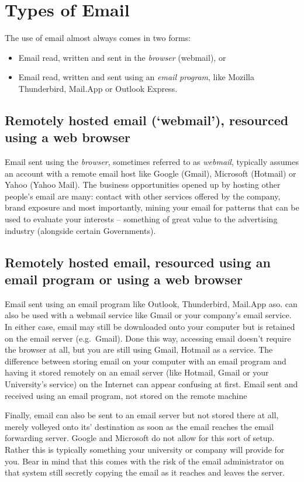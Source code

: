 \section{Types of Email}

The use of email almost always comes in two forms:

\begin{itemize}
\item
  Email read, written and sent in the \emph{browser} (webmail), or
\item
  Email read, written and sent using an \emph{email program}, like
  Mozilla Thunderbird, Mail.App or Outlook Express.
\end{itemize}
\subsection{Remotely hosted email (`webmail'), resourced using a web
browser}

Email sent using the \emph{browser}, sometimes referred to as
\emph{webmail}, typically assumes an account with a remote email host
like Google (Gmail), Microsoft (Hotmail) or Yahoo (Yahoo Mail). The
business opportunities opened up by hosting other people's email are
many: contact with other services offered by the company, brand exposure
and most importantly, mining your email for patterns that can be used to
evaluate your interests -- something of great value to the advertising
industry (alongside certain Governments).

\subsection{Remotely hosted email, resourced using an email program or
using a web browser}

Email sent using an email program like Outlook, Thunderbird, Mail.App
aso. can also be used with a webmail service like Gmail or your
company's email service. In either case, email may still be downloaded
onto your computer but is retained on the email server (e.g.~Gmail).
Done this way, accessing email doesn't require the browser at all, but
you are still using Gmail, Hotmail as a service. The difference between
storing email on your computer with an email program and having it
stored remotely on an email server (like Hotmail, Gmail or your
University's service) on the Internet can appear confusing at first.
Email sent and received using an email program, not stored on the remote
machine

Finally, email can also be sent to an email server but not stored there
at all, merely volleyed onto its' destination as soon as the email
reaches the email forwarding server. Google and Microsoft do not allow
for this sort of setup. Rather this is typically something your
university or company will provide for you. Bear in mind that this comes
with the risk of the email administrator on that system still secretly
copying the email as it reaches and leaves the server.

